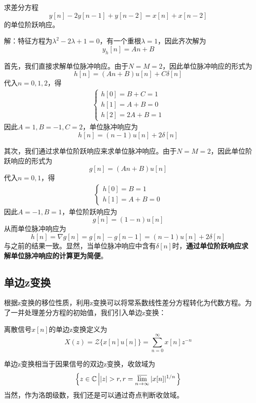 \begin{example}
    求差分方程
    $$y[n]-2y[n-1]+y[n-2]=x[n]+x[n-2]$$
    的单位阶跃响应。

    解：特征方程为$\lambda^2-2\lambda+1=0$，有一个重根$\lambda=1$，因此齐次解为
    $$y_h[n]=A n+B$$

    首先，我们直接求解单位脉冲响应。由于$N=M=2$，因此单位脉冲响应的形式为
    $$h[n]=(A n+B)u[n]+C\delta[n]$$
    代入$n=0,1,2$，得\begin{align*}
    \begin{cases}
        h[0]=B+C=1\\
        h[1]=A+B=0\\
        h[2]=2A+B=1
    \end{cases}
    \end{align*}
    因此$A=1,B=-1,C=2$，单位脉冲响应为
    $$h[n]=(n-1)u[n]+2\delta[n]$$

    其次，我们通过求单位阶跃响应来求单位脉冲响应。由于$N=M=2$，因此单位阶跃响应的形式为
    $$g[n]=(A n+B)u[n]$$
    代入$n=0,1$，得\begin{align*}
        \begin{cases}
            h[0]=B=1\\
            h[1]=A+B=0
        \end{cases}
    \end{align*}
    因此$A=-1,B=1$，单位阶跃响应为
    $$g[n]=(1-n)u[n]$$
    从而单位脉冲响应为
    $$h[n]=\nabla g[n]=g[n]-g[n-1]=(n-1)u[n]+2\delta[n]$$
    与之前的结果一致。显然，当单位脉冲响应中含有$\delta[n]$时，\textbf{通过单位阶跃响应求解单位脉冲响应的计算更为简便}。
\end{example}

\subsection{单边z变换}\label{sub:single_z}

根据z变换的移位性质，利用z变换可以将常系数线性差分方程转化为代数方程。为了一并处理差分方程的初始值，我们引入单边z变换：
\begin{definition}[单边z变换]
    离散信号$x[n]$的单边z变换定义为
    \[X(z)=\mathcal{Z}\{x[n]u[n]\}=\sum_{n=0}^{\infty}x[n]z^{-n}\]
\end{definition}

单边z变换相当于因果信号的双边z变换，收敛域为
$$\left\{z\in\mathbb{C}\left||z|>r, r=\varlimsup_{n\to\infty}|x[n]|^{1/n}\right.\right\}$$
当然，作为洛朗级数，我们还是可以通过奇点判断收敛域。

